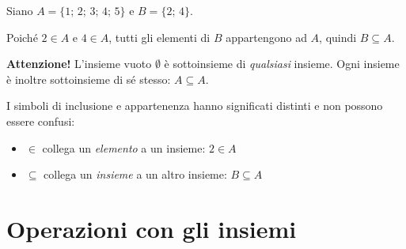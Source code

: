 \begin{esempio}
Siano $A = \{1;\, 2;\, 3;\, 4;\, 5\}$ e $B = \{2;\, 4\}$.

Poiché $2 \in A$ e $4 \in A$, tutti gli elementi di $B$ appartengono ad $A$, quindi $B \subseteq A$.

\begin{center}
\end{center}
\end{esempio}

\begin{attenzione}
\textbf{Attenzione!} L'insieme vuoto $\emptyset$ è sottoinsieme di \emph{qualsiasi} insieme. Ogni insieme è inoltre sottoinsieme di sé stesso: $A \subseteq A$.
\end{attenzione}

\begin{regola}
I simboli di inclusione e appartenenza hanno significati distinti e non possono essere confusi:
\begin{itemize}[leftmargin=1.5em]
  \item $\in$ collega un \emph{elemento} a un insieme: \quad $2 \in A$
  \item $\subseteq$ collega un \emph{insieme} a un altro insieme: \quad $B \subseteq A$
\end{itemize}
\end{regola}

\section{Operazioni con gli insiemi}

